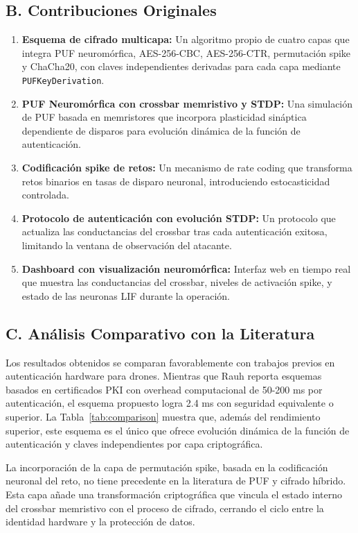 \subsection*{B. Contribuciones Originales}

\begin{enumerate}
    \item \textbf{Esquema de cifrado multicapa:} Un algoritmo propio de cuatro capas que integra PUF neuromórfica, AES-256-CBC, AES-256-CTR, permutación spike y ChaCha20, con claves independientes derivadas para cada capa mediante \texttt{PUFKeyDerivation}.
    \item \textbf{PUF Neuromórfica con crossbar memristivo y STDP:} Una simulación de PUF basada en memristores que incorpora plasticidad sináptica dependiente de disparos para evolución dinámica de la función de autenticación.
    \item \textbf{Codificación spike de retos:} Un mecanismo de rate coding que transforma retos binarios en tasas de disparo neuronal, introduciendo estocasticidad controlada.
    \item \textbf{Protocolo de autenticación con evolución STDP:} Un protocolo que actualiza las conductancias del crossbar tras cada autenticación exitosa, limitando la ventana de observación del atacante.
    \item \textbf{Dashboard con visualización neuromórfica:} Interfaz web en tiempo real que muestra las conductancias del crossbar, niveles de activación spike, y estado de las neuronas LIF durante la operación.
\end{enumerate}

\subsection*{C. Análisis Comparativo con la Literatura}

Los resultados obtenidos se comparan favorablemente con trabajos previos en autenticación hardware para drones. Mientras que Rauh \cite{rauh2020drone} reporta esquemas basados en certificados PKI con overhead computacional de 50-200 ms por autenticación, el esquema propuesto logra 2.4 ms con seguridad equivalente o superior. La Tabla~\ref{tab:comparison} muestra que, además del rendimiento superior, este esquema es el único que ofrece evolución dinámica de la función de autenticación y claves independientes por capa criptográfica.

La incorporación de la capa de permutación spike, basada en la codificación neuronal del reto, no tiene precedente en la literatura de PUF y cifrado híbrido. Esta capa añade una transformación criptográfica que vincula el estado interno del crossbar memristivo con el proceso de cifrado, cerrando el ciclo entre la identidad hardware y la protección de datos.

